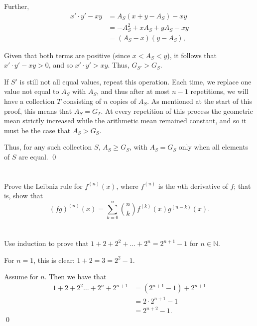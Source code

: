 Further,
\begin{align*}
    x' \cdot y' - xy &= A_S(x + y - A_S) - xy \\
    &= -A_S^2 + xA_S + yA_S - xy \\
    &= (A_S - x)(y - A_S),
\end{align*}

Given that both terms are positive (since $x < A_S < y$), it follows that $x' \cdot y' - xy > 0$, and so $x' \cdot y' > xy$. Thus, $G_{S'} > G_S$.

\pagebreak
If $S'$ is still not all equal values, repeat this operation. Each time, we replace one value not equal to $A_S$ with $A_S$, and thus after at most $n - 1$ repetitions, we will have a collection $T$ consisting of $n$ copies of $A_S$. As mentioned at the start of this proof, this means that $A_S = G_T$. At every repetition of this process the geometric mean strictly increased while the arithmetic mean remained constant, and so it must be the case that $A_S > G_S$.

Thus, for any such collection $S$, $A_S \geq G_S$, with $A_S = G_S$ only when all elements of $S$ are equal.
\qed

\section{}\label{sec:2-8}

Prove the Leibniz rule for $f^{(n)}(x)$, where $f^{(n)}$ is the $n$th derivative of $f$; that is, show that
\[(fg)^{(n)}(x) = \sum_{k=0}^n \binom{n}{k} f^{(k)}(x)g^{(n-k)}(x).\]
\hr
\section{}\label{sec:2-9}

Use induction to prove that $1 + 2 + 2^2 + \dots + 2^n = 2^{n+1} - 1$ for $n \in \mathbb{N}$.
\hr

For $n=1$, this is clear: $1 + 2 = 3 = 2^2 - 1$.

\medskip

Assume for $n$. Then we have that
\begin{align*}
    1 + 2 + 2^2 \dots + 2^n + 2^{n+1} &= (2^{n+1} - 1) + 2^{n+1} \\
    &= 2 \cdot 2^{n+1} - 1 \\
    &= 2^{n+2} - 1.
\end{align*}
\qed
\section{}\label{sec:2-10}

